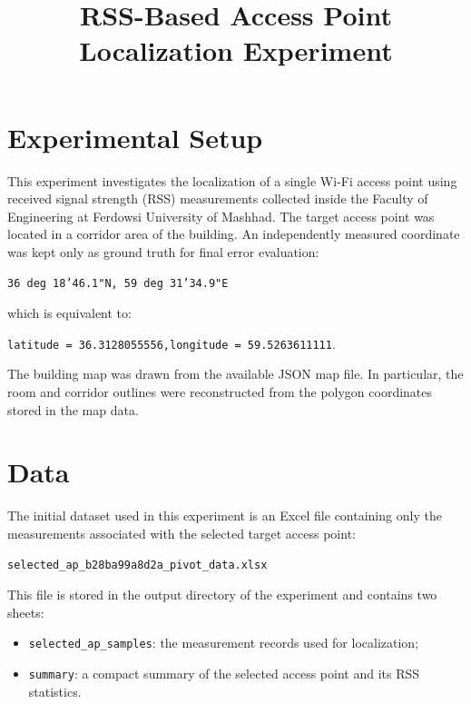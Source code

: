 \documentclass[11pt,a4paper]{article}
\title{RSS-Based Access Point Localization Experiment}
\author{}
\date{}
\begin{document}
\maketitle

\section{Experimental Setup}

This experiment investigates the localization of a single Wi-Fi access point
using received signal strength (RSS) measurements collected inside the Faculty
of Engineering at Ferdowsi University of Mashhad. The target access point was
located in a corridor area of the building. An independently measured coordinate
was kept only as ground truth for final error evaluation:

\begin{center}
\texttt{36 deg 18'46.1"N, 59 deg 31'34.9"E}
\end{center}

which is equivalent to:

\begin{center}
\texttt{latitude = 36.3128055556,\quad longitude = 59.5263611111}.
\end{center}

The building map was drawn from the available JSON map file. In particular, the
room and corridor outlines were reconstructed from the polygon coordinates
stored in the map data.

\section{Data}

The initial dataset used in this experiment is an Excel file containing only the
measurements associated with the selected target access point:

\begin{center}
\texttt{selected\_ap\_b28ba99a8d2a\_pivot\_data.xlsx}
\end{center}

This file is stored in the output directory of the experiment and contains two
sheets:

\begin{itemize}
\item \texttt{selected\_ap\_samples}: the measurement records used for
localization;
\item \texttt{summary}: a compact summary of the selected access point and its
RSS statistics.
\end{itemize}
\end{document}
